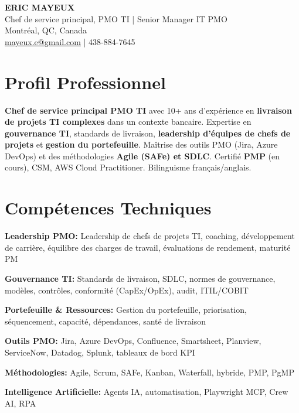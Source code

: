 \documentclass[11pt,a4paper]{article}
\begin{document}
\begin{center}
    {\LARGE \textbf{ERIC MAYEUX}}\\
    \vspace{4pt}
    {\large Chef de service principal, PMO TI | Senior Manager IT PMO}\\
    \vspace{4pt}
    Montréal, QC, Canada\\
    \href{mailto:mayeux.e@gmail.com}{mayeux.e@gmail.com} | 438-884-7645
\end{center}

\vspace{8pt}

\section*{Profil Professionnel}
\noindent
\textbf{Chef de service principal PMO TI} avec 10+ ans d'expérience en \textbf{livraison de projets TI complexes} dans un contexte bancaire. Expertise en \textbf{gouvernance TI}, standards de livraison, \textbf{leadership d'équipes de chefs de projets} et \textbf{gestion du portefeuille}. Maîtrise des outils PMO (Jira, Azure DevOps) et des méthodologies \textbf{Agile (SAFe) et SDLC}. Certifié \textbf{PMP} (en cours), CSM, AWS Cloud Practitioner. Bilinguisme français/anglais.

\section*{Compétences Techniques}

\textbf{Leadership PMO:} Leadership de chefs de projets TI, coaching, développement de carrière, équilibre des charges de travail, évaluations de rendement, maturité PM

\textbf{Gouvernance TI:} Standards de livraison, SDLC, normes de gouvernance, modèles, contrôles, conformité (CapEx/OpEx), audit, ITIL/COBIT

\textbf{Portefeuille \& Ressources:} Gestion du portefeuille, priorisation, séquencement, capacité, dépendances, santé de livraison

\textbf{Outils PMO:} Jira, Azure DevOps, Confluence, Smartsheet, Planview, ServiceNow, Datadog, Splunk, tableaux de bord KPI

\textbf{Méthodologies:} Agile, Scrum, SAFe, Kanban, Waterfall, hybride, PMP, PgMP

\textbf{Intelligence Artificielle:} Agents IA, automatisation, Playwright MCP, Crew AI, RPA
\end{document}
